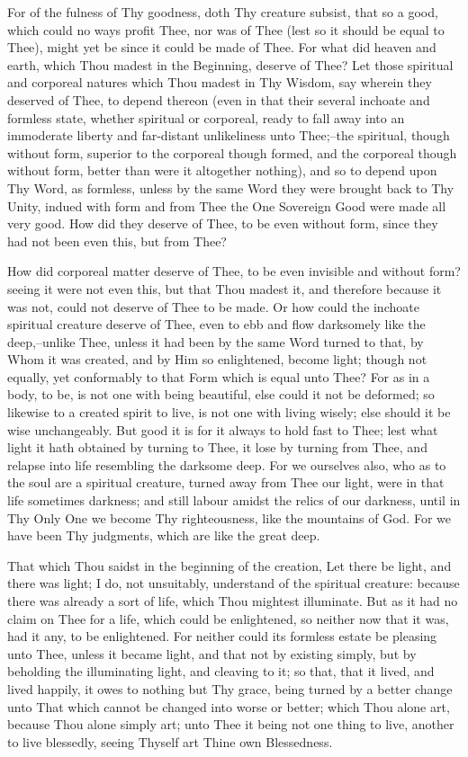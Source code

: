 \documentclass[b5paper,openright,12pt,twoside]{book}
\begin{document}
For of the fulness of Thy goodness, doth Thy creature subsist, that so
a good, which could no ways profit Thee, nor was of Thee (lest so it
should be equal to Thee), might yet be since it could be made of Thee.
For what did heaven and earth, which Thou madest in the Beginning,
deserve of Thee? Let those spiritual and corporeal natures which Thou
madest in Thy Wisdom, say wherein they deserved of Thee, to depend
thereon (even in that their several inchoate and formless state, whether
spiritual or corporeal, ready to fall away into an immoderate liberty
and far-distant unlikeliness unto Thee;--the spiritual, though without
form, superior to the corporeal though formed, and the corporeal though
without form, better than were it altogether nothing), and so to depend
upon Thy Word, as formless, unless by the same Word they were brought
back to Thy Unity, indued with form and from Thee the One Sovereign
Good were made all very good. How did they deserve of Thee, to be even
without form, since they had not been even this, but from Thee?

How did corporeal matter deserve of Thee, to be even invisible and
without form? seeing it were not even this, but that Thou madest it, and
therefore because it was not, could not deserve of Thee to be made. Or
how could the inchoate spiritual creature deserve of Thee, even to ebb
and flow darksomely like the deep,--unlike Thee, unless it had been
by the same Word turned to that, by Whom it was created, and by Him so
enlightened, become light; though not equally, yet conformably to that
Form which is equal unto Thee? For as in a body, to be, is not one with
being beautiful, else could it not be deformed; so likewise to a created
spirit to live, is not one with living wisely; else should it be wise
unchangeably. But good it is for it always to hold fast to Thee; lest
what light it hath obtained by turning to Thee, it lose by turning
from Thee, and relapse into life resembling the darksome deep. For we
ourselves also, who as to the soul are a spiritual creature, turned away
from Thee our light, were in that life sometimes darkness; and still
labour amidst the relics of our darkness, until in Thy Only One we
become Thy righteousness, like the mountains of God. For we have been
Thy judgments, which are like the great deep.

That which Thou saidst in the beginning of the creation, Let there be
light, and there was light; I do, not unsuitably, understand of the
spiritual creature: because there was already a sort of life, which Thou
mightest illuminate. But as it had no claim on Thee for a life, which
could be enlightened, so neither now that it was, had it any, to be
enlightened. For neither could its formless estate be pleasing unto
Thee, unless it became light, and that not by existing simply, but by
beholding the illuminating light, and cleaving to it; so that, that it
lived, and lived happily, it owes to nothing but Thy grace, being turned
by a better change unto That which cannot be changed into worse or
better; which Thou alone art, because Thou alone simply art; unto
Thee it being not one thing to live, another to live blessedly, seeing
Thyself art Thine own Blessedness.
\end{document}

